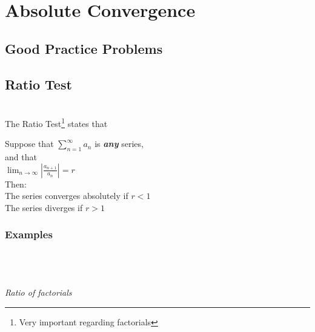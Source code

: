 \documentclass{article}
\begin{document}
{\begin{tikzpicture}
        \end{tikzpicture}
    }

\endgroup
\vspace*{\fill}

\pagebreak

\section{\centering \huge Absolute Convergence \\ }
    \subsection{Good Practice Problems}
    \subsection{Ratio Test} 
    \hrulefill \\[10pt]

    The Ratio Test\footnote{Very important regarding factorials} states that 
        
        \begingroup
        \centering
        Suppose that $\displaystyle \sum_{n=1}^{\infty} a_n$ is \textit{\textbf{any}} series,\\
        and that\\[5pt]\textbf{}
        $\displaystyle \lim_{n \rightarrow \infty} \left| \frac{a_{n+1}}{a_n} \right| = r$\\[10pt]
        Then: \\[5pt]
        The series converges absolutely if $r < 1$\\
        The series diverges if $r > 1$\\
        \endgroup

    \subsubsection{Examples}

        \begingroup
        \centering

        \\

        \hrulefill \\[10pt]

        \\[5pt]
        \textit{Ratio of factorials}\\[15pt]
\end{document}
